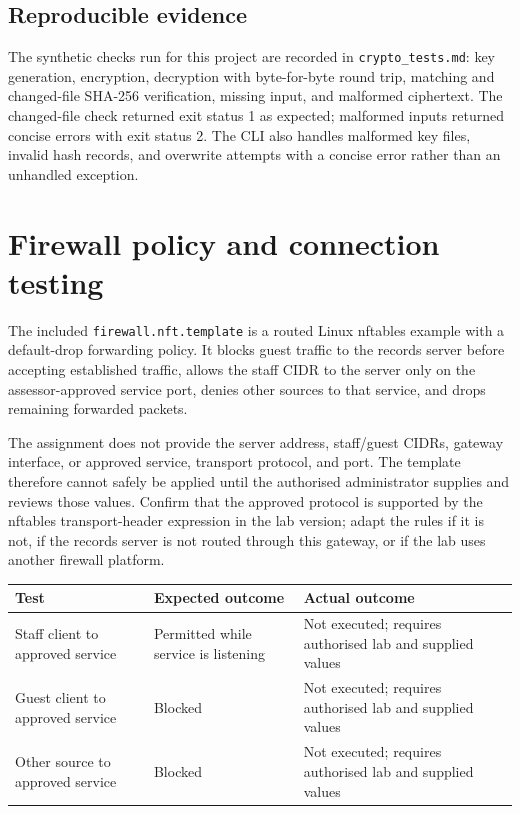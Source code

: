 \documentclass[11pt,a4paper]{article}
\begin{document}
\subsection{Reproducible evidence}
The synthetic checks run for this project are recorded in \texttt{crypto\_tests.md}: key generation, encryption, decryption with byte-for-byte round trip, matching and changed-file SHA-256 verification, missing input, and malformed ciphertext. The changed-file check returned exit status 1 as expected; malformed inputs returned concise errors with exit status 2. The CLI also handles malformed key files, invalid hash records, and overwrite attempts with a concise error rather than an unhandled exception.

\section{Firewall policy and connection testing}
The included \texttt{firewall.nft.template} is a routed Linux nftables example with a default-drop forwarding policy. It blocks guest traffic to the records server before accepting established traffic, allows the staff CIDR to the server only on the assessor-approved service port, denies other sources to that service, and drops remaining forwarded packets.

The assignment does not provide the server address, staff/guest CIDRs, gateway interface, or approved service, transport protocol, and port. The template therefore cannot safely be applied until the authorised administrator supplies and reviews those values. Confirm that the approved protocol is supported by the nftables transport-header expression in the lab version; adapt the rules if it is not, if the records server is not routed through this gateway, or if the lab uses another firewall platform.

\begin{tabularx}{\textwidth}{>{\raggedright\arraybackslash}p{}XX}
\toprule
Test & Expected outcome & Actual outcome\\
\midrule
Staff client to approved service & Permitted while service is listening & Not executed; requires authorised lab and supplied values\\
Guest client to approved service & Blocked & Not executed; requires authorised lab and supplied values\\
Other source to approved service & Blocked & Not executed; requires authorised lab and supplied values\\
\bottomrule
\end{tabularx}
\end{document}
